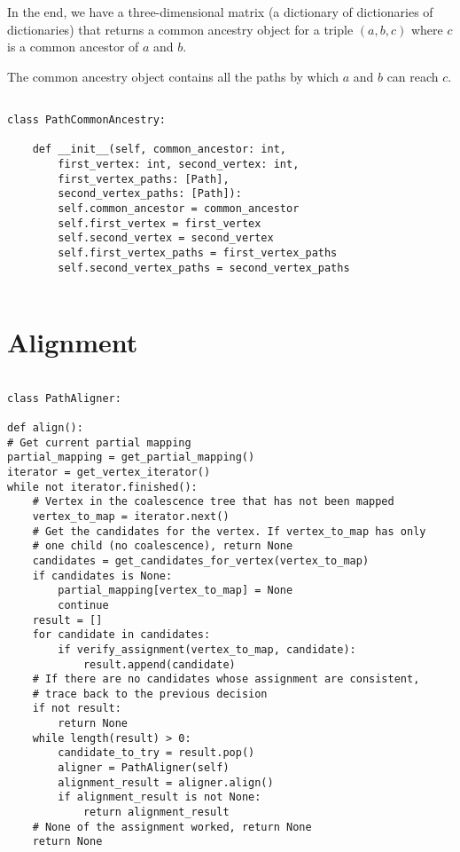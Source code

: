 \documentclass[14pt]{extarticle}
\begin{document}
In the end, we have a three-dimensional matrix (a dictionary of dictionaries of dictionaries) that returns a common ancestry object for a triple $(a, b, c)$ where $c$ is a common ancestor of $a$ and $b$.

The common ancestry object contains all the paths by which $a$ and $b$ can reach $c$.

\begin{lstlisting}

class PathCommonAncestry:
	
	def __init__(self, common_ancestor: int,
		first_vertex: int, second_vertex: int,
		first_vertex_paths: [Path],
		second_vertex_paths: [Path]):
		self.common_ancestor = common_ancestor
		self.first_vertex = first_vertex
		self.second_vertex = second_vertex
		self.first_vertex_paths = first_vertex_paths
		self.second_vertex_paths = second_vertex_paths
	

\end{lstlisting}

\newpage

\section{Alignment}

\vspace*{-\baselineskip}

\begin{lstlisting}

class PathAligner:

def align():
# Get current partial mapping
partial_mapping = get_partial_mapping()
iterator = get_vertex_iterator()
while not iterator.finished():
	# Vertex in the coalescence tree that has not been mapped
	vertex_to_map = iterator.next()
	# Get the candidates for the vertex. If vertex_to_map has only
	# one child (no coalescence), return None
	candidates = get_candidates_for_vertex(vertex_to_map)
	if candidates is None:
		partial_mapping[vertex_to_map] = None
		continue
	result = []
	for candidate in candidates:
		if verify_assignment(vertex_to_map, candidate):
			result.append(candidate)
	# If there are no candidates whose assignment are consistent,
	# trace back to the previous decision
	if not result:
		return None			
	while length(result) > 0:
		candidate_to_try = result.pop()
		aligner = PathAligner(self)
		alignment_result = aligner.align()
		if alignment_result is not None:
			return alignment_result
	# None of the assignment worked, return None
	return None
\end{lstlisting}
\end{document}
